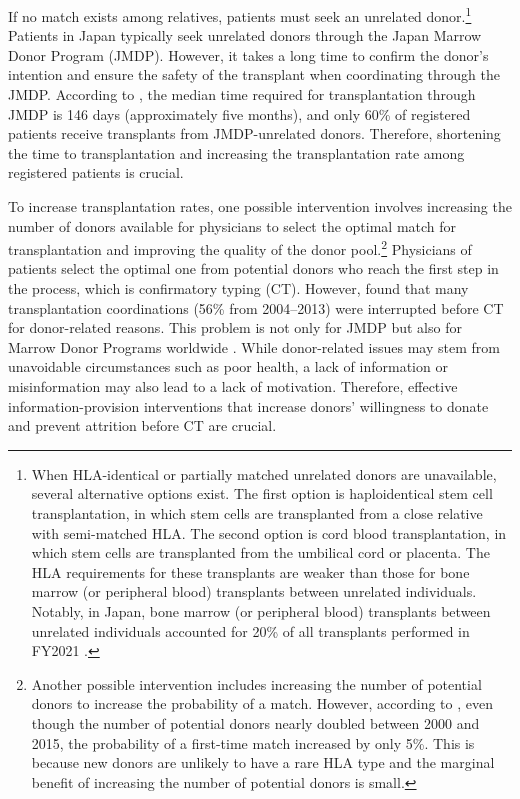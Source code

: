 \documentclass[12pt, a4paper]{article}
\begin{document}
If no match exists among relatives, patients must seek an unrelated donor.\footnote{When HLA-identical or partially matched unrelated donors are unavailable, several alternative options exist. The first option is haploidentical stem cell transplantation, in which stem cells are transplanted from a close relative with semi-matched HLA. The second option is cord blood transplantation, in which stem cells are transplanted from the umbilical cord or placenta. The HLA requirements for these transplants are weaker than those for bone marrow (or peripheral blood) transplants between unrelated individuals. Notably, in Japan, bone marrow (or peripheral blood) transplants between unrelated individuals accounted for 20\% of all transplants performed in FY2021 \citep{JapaneseDataCenterf2022}.} Patients in Japan typically seek unrelated donors through the Japan Marrow Donor Program (JMDP). However, it takes a long time to confirm the donor's intention and ensure the safety of the transplant when coordinating through the JMDP. According to \citet{Hirakawa2018}, the median time required for transplantation through JMDP is 146 days (approximately five months), and only 60\% of registered patients receive transplants from JMDP-unrelated donors. Therefore, shortening the time to transplantation and increasing the transplantation rate among registered patients is crucial.

To increase transplantation rates, one possible intervention involves increasing the number of donors available for physicians to select the optimal match for transplantation and improving the quality of the donor pool.\footnote{Another possible intervention includes increasing the number of potential donors to increase the probability of a match. However, according to \citet{Takanashi2016}, even though the number of potential donors nearly doubled between 2000 and 2015, the probability of a first-time match increased by only 5\%. This is because new donors are unlikely to have a rare HLA type and the marginal benefit of increasing the number of potential donors is small.} Physicians of patients select the optimal one from potential donors who reach the first step in the process, which is confirmatory typing (CT). However, \citet{Hirakawa2018} found that many transplantation coordinations (56\% from 2004--2013) were interrupted before CT for donor-related reasons. This problem is not only for JMDP but also for Marrow Donor Programs worldwide \citep{Haylock2024}. While donor-related issues may stem from unavoidable circumstances such as poor health, a lack of information or misinformation may also lead to a lack of motivation. Therefore, effective information-provision interventions that increase donors' willingness to donate and prevent attrition before CT are crucial.
\end{document}
